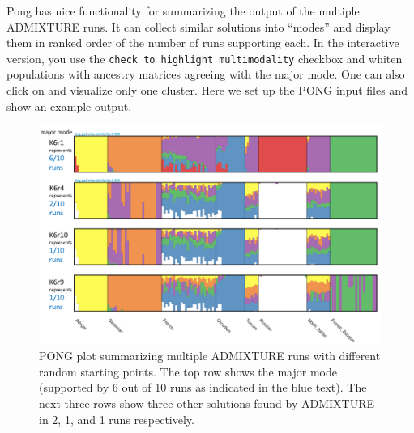 \documentclass{svmult}       %
\newenvironment{Shaded}{\begin{snugshade}}{\end{snugshade}}
\newcommand{\KeywordTok}[1]{\textcolor[rgb]{0.13,0.29,0.53}{\textbf{#1}}}
\newcommand{\DataTypeTok}[1]{\textcolor[rgb]{0.13,0.29,0.53}{#1}}
\newcommand{\StringTok}[1]{\textcolor[rgb]{0.31,0.60,0.02}{#1}}
\newcommand{\CommentTok}[1]{\textcolor[rgb]{0.56,0.35,0.01}{\textit{#1}}}
\newcommand{\FunctionTok}[1]{\textcolor[rgb]{0.00,0.00,0.00}{#1}}
\newcommand{\VariableTok}[1]{\textcolor[rgb]{0.00,0.00,0.00}{#1}}
\newcommand{\OperatorTok}[1]{\textcolor[rgb]{0.81,0.36,0.00}{\textbf{#1}}}
\newcommand{\ExtensionTok}[1]{#1}
\newcommand{\NormalTok}[1]{#1}
\begin{document}
Pong has nice functionality for summarizing the output of the multiple
ADMIXTURE runs. It can collect similar solutions into ``modes'' and
display them in ranked order of the number of runs supporting each. In
the interactive version, you use the
\texttt{check\ to\ highlight\ multimodality} checkbox and whiten
populations with ancestry matrices agreeing with the major mode. One can
also click on and visualize only one cluster. Here we set up the PONG
input files and show an example output.

\begin{Shaded}
\end{Shaded}

\begin{figure}
\includegraphics[width=1\linewidth]{Figures/Figure3}
\caption{\label{fig:Fig3}
    PONG plot summarizing multiple ADMIXTURE runs with different random starting points.  The top row shows the major mode (supported by 6 out of 10 runs as indicated in the blue text).  The next three rows show three other solutions found by ADMIXTURE in 2, 1, and 1 runs respectively.}
\end{figure}
\end{document}
